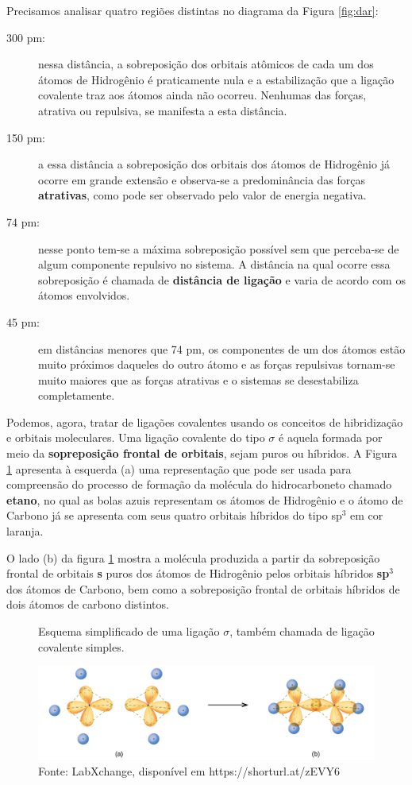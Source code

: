 Precisamos analisar quatro regiões distintas no diagrama da Figura \ref{fig:dar}:

\begin{description}
	\item[300 pm:] nessa distância, a sobreposição dos orbitais atômicos de cada um dos átomos de Hidrogênio é praticamente nula e a estabilização que a ligação covalente traz aos átomos ainda não ocorreu. Nenhumas das forças, atrativa ou repulsiva, se manifesta a esta distância.
	\item[150 pm:] a essa distância a sobreposição dos orbitais dos átomos de Hidrogênio já ocorre em grande extensão e observa-se a predominância das forças \textbf{atrativas}, como pode ser observado pelo valor de energia negativa. 
	\item[74 pm:] nesse ponto tem-se a máxima sobreposição possível sem que perceba-se de algum componente repulsivo no sistema. A distância na qual ocorre essa sobreposição é chamada de \textbf{distância de ligação} e varia de acordo com os átomos envolvidos. 
	\item[45 pm:] em distâncias menores que 74 pm, os componentes de um dos átomos estão muito próximos daqueles do outro átomo e as forças repulsivas tornam-se muito maiores que as forças atrativas e o sistemas se desestabiliza completamente.  
\end{description}

Podemos, agora, tratar de ligações covalentes usando os conceitos de hibridização e orbitais moleculares. Uma ligação covalente do tipo $\sigma$ é aquela formada por meio da \textbf{sopreposição frontal de orbitais}, sejam puros ou híbridos. A Figura \ref{fig:sigma} apresenta à esquerda (a) uma representação que pode ser usada para compreensão do processo de formação da molécula do hidrocarboneto chamado \textbf{etano}, no qual as bolas azuis representam os átomos de Hidrogênio e o átomo de Carbono já se apresenta com seus quatro orbitais híbridos do tipo sp$^3$ em cor laranja.

O lado (b) da figura \ref{fig:sigma} mostra a molécula produzida a partir da sobreposição frontal de orbitais \textbf{s} puros dos átomos de Hidrogênio pelos orbitais híbridos \textbf{sp$^3$} dos átomos de Carbono, bem como a sobreposição frontal de orbitais híbridos de dois átomos de carbono distintos.

\begin{figure}[h]
\centering
\caption{Esquema simplificado de uma ligação $\sigma$, também chamada de ligação covalente simples.}
\vspace{0.25cm}
\label{fig:sigma}
\includegraphics[width=1\linewidth]{imagens/sigma.jpg}
\caption*{Fonte: LabXchange, disponível em https://shorturl.at/zEVY6}
\end{figure}

